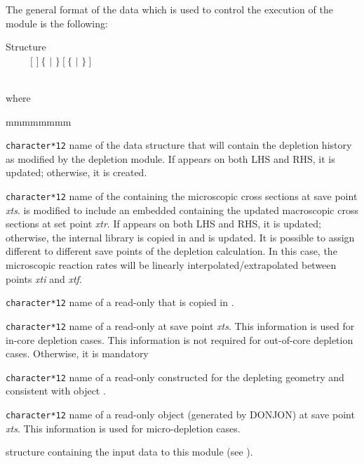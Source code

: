\vskip 0.2cm

The general format of the data which is used to control
the execution of the  module is the following:

\begin{DataStructure}{Structure }
  \moc{:=}  \\
~~~~~$[$  $]~\{$  $|$  $\}~[~\{$   $|$  $\}~]$\\
~~~~~\moc{::} 
\end{DataStructure}

\noindent where

\begin{ListeDeDescription}{mmmmmmmm}

\item[\dusa{BRNNAM}] {\tt character*12} name of the  data
structure that will contain the
depletion history as modified by the depletion module. If  appears
on both LHS and RHS, it is updated; otherwise, it is created.

\item[\dusa{MICNAM}] {\tt character*12} name of the  containing
the microscopic cross sections at save point {\sl xts}.  is modified
to include an embedded  containing the updated macroscopic cross
sections at set point {\sl xtr}. If  appears on both LHS and RHS,
it is updated; otherwise, the internal library  is copied in
 and  is updated. It is possible to assign different
 to different save points of the depletion calculation. In this
case, the microscopic reaction rates will be linearly interpolated/extrapolated
between points {\sl xti} and {\sl xtf}.

\item[\dusa{OLDMIC}] {\tt character*12} name of a read-only 
that is copied in .

\item[\dusa{FLUNAM}] {\tt character*12} name of a read-only  at save point
{\sl xts}. This information is used for in-core depletion cases. This information is not required for
out-of-core depletion cases. Otherwise, it is mandatory

\item[\dusa{TRKNAM}] {\tt character*12} name of a read-only 
constructed for the depleting geometry and consistent with object .

\item[\dusa{POWNAM}] {\tt character*12} name of a read-only  object (generated by DONJON) at save point
{\sl xts}. This information is used for micro-depletion cases.

\item[\dstr{descevo}] structure containing the input data to this module
(see ).

\end{ListeDeDescription}

